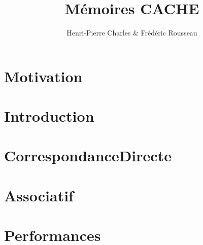 \documentclass{beamer}
\title{Mémoires CACHE}
\author{Henri-Pierre Charles \& Frédéric Rousseau}
\date{}
\newcommand{\Slide}[1]{}
\begin{document}
\begin{frame}
\titlepage
\end{frame}

\section{Motivation}
\Slide{Introduction/SlideIntro}
\begin{frame}
\tableofcontents[ 
currentsubsection, 
hideothersubsections, 
sectionstyle=show/hide, 
subsectionstyle=show/shaded, 
] 
\end{frame}


\section{Introduction}
\Slide{Intro/NecessiteCache}
\Slide{Intro/PrincipesLocalite}

\section{CorrespondanceDirecte}
\Slide{CorrespondanceDirecte/Principes}
\Slide{CorrespondanceDirecte/ArchiGenerale}
\Slide{CorrespondanceDirecte/Questions1}
\Slide{CorrespondanceDirecte/DECStation_3100}
\Slide{CorrespondanceDirecte/Principes2}
\Slide{CorrespondanceDirecte/ArchiGeneraleBloc}

\section{Associatif}
\Slide{Associatif/Principes}
\Slide{Associatif/ALPHA21264}

\section{Performances}
\Slide{Performances/Principes}
\end{document}
